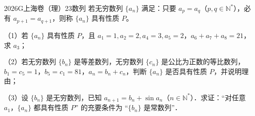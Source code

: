 
\begin{problem}{2026}{G}{上海卷（理）}{23}{数列}
若无穷数列 $\{a_n\}$ 满足：只要 $a_p = a_q$（$p,q \in \mathbb{N}^*$），必有 $a_{p+1} = a_{q+1}$，则称 $\{a_n\}$ 具有性质 $P$。

（1）若 $\{a_n\}$ 具有性质 $P$，且 $a_1 = 1, a_2 = 2, a_4 = 3, a_5 = 2$，$a_6 + a_7 + a_8 = 21$，求 $a_3$；

（2）若无穷数列 $\{b_n\}$ 是等差数列，无穷数列 $\{c_n\}$ 是公比为正数的等比数列，$b_1 = c_5 = 1$，$b_5 = c_1 = 81$，$a_n = b_n + c_n$，判断 $\{a_n\}$ 是否具有性质 $P$，并说明理由；

（3）设 $\{b_n\}$ 是无穷数列，已知 $a_{n+1} = b_n + \sin a_n$（$n \in \mathbb{N}^*$）．求证：“对任意 $a_1$，$\{a_n\}$ 都具有性质 $P$” 的充要条件为 “$\{b_n\}$ 是常数列”．
\end{problem}